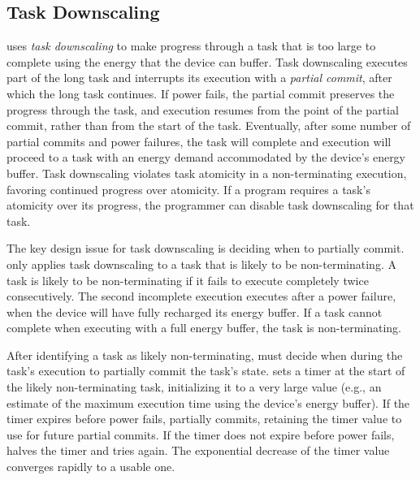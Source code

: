 \subsection{Task Downscaling}
\label{sec:task_downsizing}

\sys uses {\em task downscaling} to make progress through a task that is too
large to complete using the energy that the device can buffer.  Task
downscaling executes part of the long task and interrupts its execution with a
{\em partial commit}, after which the long task continues. If power fails, the
partial commit preserves the progress through the task, and execution resumes
from the point of the partial commit, rather than from the start of the task.
Eventually, after some number of partial commits and power failures, the task
will complete and execution will proceed to a task with an energy demand
accommodated by the device's energy buffer. Task downscaling violates task
atomicity in a non-terminating execution, favoring continued progress over
atomicity. If a program requires a task's atomicity over its progress, 
the programmer can disable task downscaling for that task.

The key design issue for task downscaling is deciding when to partially commit.
\sys only applies task downscaling to a task that is likely to be
non-terminating.  A task is likely to be non-terminating if it fails to execute
completely twice consecutively. The second incomplete execution executes after
a power failure, when the device will have fully recharged its energy buffer.
If a task cannot complete when executing with a full energy buffer, the task is
non-terminating.

After identifying a task as likely non-terminating, \sys must decide when
during the task's execution to partially commit the task's state.
%
\sys sets a timer at the start of the likely non-terminating task, initializing
it to a very large value (e.g., an estimate of the maximum execution time using
the device's energy buffer).
%
If the timer expires before power fails, \sys partially commits, retaining 
the timer value to use for future partial commits. 
%
If the timer does not expire before power fails, \sys halves the timer and
tries again.
%
The exponential decrease of the timer value converges rapidly to a usable one.
